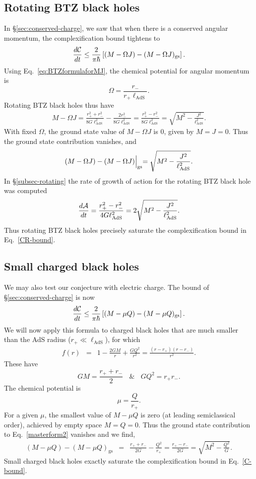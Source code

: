 \documentclass[12pt]{article}
\numberwithin{equation}{section}
\newcommand{\be}{\begin{equation}}
\newcommand{\ee}{\end{equation}}
\def\bea{\begin{eqnarray}}
\def\eea{\end{eqnarray}}
\def\CA{{\cal A}}
\def\CC{{\cal C}}
\newcommand{\lads}{\ell_{\text{AdS}}}
\renewcommand{\eqref}[1]{Eq.~\ref{#1}}
\begin{document}
\subsection{Rotating BTZ black holes}

In \S\ref{sec:conserved-charge}, we saw that when there is a conserved angular momentum, the complexification bound tightens to
\be
\frac{d \CC }{dt} \leq \frac{2}{\pi \hbar} \left[ (M - \Omega J) -(M-\Omega J)_\textrm{gs} \right] .
\label{masterform}
\ee
Using Eq.~\ref{eq:BTZformulaforMJ}, the chemical potential for angular momentum is
\begin{equation}
\Omega = \frac{r_-}{r_+ \lads}.
\end{equation}
Rotating BTZ black holes thus have
\begin{align}
M-\Omega J=\frac{r_+^2+r_-^2}{8 G \lads^2}-\frac{2r_-^2}{8 G \lads^2}=\frac{r_+^2-r_-^2}{8 G \lads^2}=\sqrt{M^2-\frac{J^2}{ \lads^2}}.
\end{align}
With fixed $\Omega$, the ground state value of $M-\Omega J$ is $0$, given by $M = J =0$. Thus the ground state contribution  vanishes, and
\begin{equation}
(M-\Omega J)-(M-\Omega J)\Bigl|_{\text{gs}}=\sqrt{M^2-\frac{J^2}{\lads^2}}.
\end{equation}
In \S\ref{subsec-rotating} the rate of growth of action for the rotating BTZ black hole was computed
\begin{align}
\frac{d\CA}{dt}=\frac{r_+^2-r_-^2}{4G \lads^2}=2\sqrt{M^2-\frac{J^2}{\lads^2}}.
\end{align}
Thus rotating BTZ black holes precisely saturate the complexification bound in Eq.~\ref{CR-bound}.





\subsection{Small charged black holes} \label{sec:smallchargedblackholescomplexity}
We may also test our conjecture with electric charge. The bound of \S\ref{sec:conserved-charge} is now
\be
\frac{d \CC}{dt} \leq \frac{2}{\pi \hbar} \left[ (M - \mu Q) -(M-\mu Q)_\textrm{gs} \right] .
\label{masterform2}
\ee
We will now apply this formula to charged black holes that are much smaller than the AdS radius ($r_+ \ll \lads$), for which
\bea
f(r) &=& 1 -\frac{2GM}{r} + \frac{GQ^2}{r^2} = \frac{(r-r_+)(r-r_-)}{r^2}.
\eea
These have
\begin{equation}
GM = \frac{r_+ + r_-}{2}  \ \ \ \ \& \ \ \ \ GQ^2 = r_+ r_-.
\end{equation}
The chemical potential is
\be
\mu = \frac{Q}{r_+}.
\ee
For a given $\mu$, the smallest value of $M- \mu Q$ is zero (at leading semiclassical order), achieved by empty space $M=Q =0$. Thus the ground state contribution to \eqref{masterform2} vanishes and we find,
\bea
 (M - \mu Q) -(M-\mu Q)_\textrm{gs}  &=& \frac{r_+ + r_-}{2G} -\frac{Q^2}{r_+} = \frac{r_+ - r_-}{2G} = \sqrt{M^2 -\frac{Q^2}{G}} .
\eea
Small charged black holes exactly saturate the complexification bound in Eq.~\ref{C-bound}.
\end{document}
